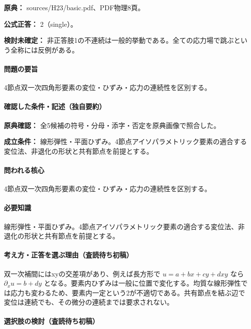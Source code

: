 \noindent\textbf{原典：} sources/H23/basic.pdf、PDF物理8頁。

\textbf{公式正答：} 2（single）。

\par\textbf{検討未確定：} 非正答肢1の不連続は一般的挙動である。全ての応力場で跳ぶという全称には反例がある。

\paragraph{問題の要旨} 4節点双一次四角形要素の変位・ひずみ・応力の連続性を区別する。

\paragraph{確認した条件・記述（独自要約）}\mbox{}\par

\noindent\textbf{原典確認：} 全5候補の符号・分母・添字・否定を原典画像で照合した。\par

\noindent\textbf{成立条件：} 線形弾性・平面ひずみ。4節点アイソパラメトリック要素の適合する変位法、非退化の形状と共有節点を前提とする。\par

\paragraph{問われる核心} 4節点双一次四角形要素の変位・ひずみ・応力の連続性を区別する。

\paragraph{必要知識} 線形弾性・平面ひずみ。4節点アイソパラメトリック要素の適合する変位法、非退化の形状と共有節点を前提とする。

\paragraph{考え方・正答を選ぶ理由（査読待ち初稿）} 双一次補間にはxyの交差項があり、例えば長方形で \(u=a+bx+cy+dxy\) なら \(\partial_xu=b+dy\) となる。要素内ひずみは一般に位置で変化する。均質な線形弾性では応力も変わるため、要素内一定という2が不適切である。共有節点を結ぶ辺で変位は連続でも、その微分の連続までは要求されない。

\paragraph{選択肢の検討（査読待ち初稿）}\mbox{}\par

